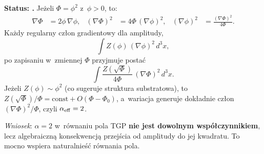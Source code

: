 \begin{proposition}[$\alpha_{\rm eff} = 2$ z~przej\'scia
  $\phi \to \Phi = \phi^2$]%
\label{prop:Q-alpha-from-phi-squared}
\textbf{Status: .}
Je\.zeli $\Phi = \phi^2$ z~$\phi > 0$, to:
\begin{align}
  \nabla\Phi &= 2\phi\,\nabla\phi, &
  (\nabla\Phi)^2 &= 4\Phi\,(\nabla\phi)^2, &
  (\nabla\phi)^2 &= \frac{(\nabla\Phi)^2}{4\Phi}.
\end{align}
Ka\.zdy regularny cz\l{}on gradientowy dla amplitudy,
\[
  \int Z(\phi)\,(\nabla\phi)^2\,d^3x,
\]
po zapisaniu w~zmiennej $\Phi$ przyjmuje posta\'c
\[
  \int \frac{Z(\sqrt{\Phi})}{4\Phi}\,(\nabla\Phi)^2\,d^3x.
\]
Je\.zeli $Z(\phi) \sim \phi^2$ (co sugeruje struktura substratowa),
to $Z(\sqrt{\Phi})/\Phi = \mathrm{const} + O(\Phi - \Phi_0)$,
a~wariacja generuje dok\l{}adnie cz\l{}on $(\nabla\Phi)^2/\Phi$,
czyli \textbf{$\alpha_{\rm eff} = 2$}.

\medskip\noindent
\textit{Wniosek}: $\alpha = 2$ w~r\'ownaniu pola TGP
\textbf{nie jest dowolnym wsp\'o\l{}czynnikiem}, lecz
algebraiczn\k{a} konsekwencj\k{a} przej\'scia od amplitudy
do jej kwadratu. To mocno wspiera naturalnie\'s\'c r\'ownania pola.
\end{proposition}
